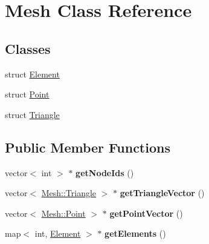 \hypertarget{class_mesh}{
\section{Mesh Class Reference}
\label{class_mesh}
}
\subsection*{Classes}
\begin{DoxyCompactItemize}
\item 
struct \hyperlink{struct_mesh_1_1_element}{Element}
\item 
struct \hyperlink{struct_mesh_1_1_point}{Point}
\item 
struct \hyperlink{struct_mesh_1_1_triangle}{Triangle}
\end{DoxyCompactItemize}
\subsection*{Public Member Functions}
\begin{DoxyCompactItemize}
\item 
\hypertarget{class_mesh_aa28ea4356f60cc6b68cfeb881e24db89}{
vector$<$ int $>$ $\ast$ {\bfseries getNodeIds} ()}
\label{class_mesh_aa28ea4356f60cc6b68cfeb881e24db89}

\item 
\hypertarget{class_mesh_af44191ed103dcc3fb0752a73811499db}{
vector$<$ \hyperlink{struct_mesh_1_1_triangle}{Mesh::Triangle} $>$ $\ast$ {\bfseries getTriangleVector} ()}
\label{class_mesh_af44191ed103dcc3fb0752a73811499db}

\item 
\hypertarget{class_mesh_ad64985d2bf2e648dc23b9dcfac119a3c}{
vector$<$ \hyperlink{struct_mesh_1_1_point}{Mesh::Point} $>$ $\ast$ {\bfseries getPointVector} ()}
\label{class_mesh_ad64985d2bf2e648dc23b9dcfac119a3c}

\item 
\hypertarget{class_mesh_a1adec173c51ea1bc1172a7ec49056bc0}{
map$<$ int, \hyperlink{struct_mesh_1_1_element}{Element} $>$ $\ast$ {\bfseries getElements} ()}
\label{class_mesh_a1adec173c51ea1bc1172a7ec49056bc0}

\end{DoxyCompactItemize}
